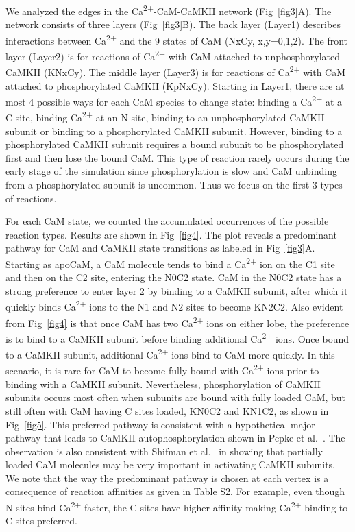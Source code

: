 \documentclass[10pt,letterpaper]{article}
\begin{document}
We analyzed the edges in the Ca\textsuperscript{2+}-CaM-CaMKII network (Fig~\ref{fig3}A). The network consists of three layers (Fig~\ref{fig3}B). The back layer (Layer1) describes interactions between Ca\textsuperscript{2+} and the 9 states of CaM (NxCy, x,y=0,1,2). The front layer (Layer2) is for reactions of Ca\textsuperscript{2+} with CaM attached to unphosphorylated CaMKII (KNxCy). The middle layer (Layer3) is for reactions of Ca\textsuperscript{2+} with CaM attached to phosphorylated CaMKII (KpNxCy). Starting in Layer1, there are at most 4 possible ways for each CaM species to change state: binding a Ca\textsuperscript{2+} at a C site, binding Ca\textsuperscript{2+} at an N site, binding to an unphosphorylated CaMKII subunit or binding to a phosphorylated CaMKII subunit. However, binding to a phosphorylated CaMKII subunit requires a bound subunit to be phosphorylated first and then lose the bound CaM. This type of reaction rarely occurs during the early stage of the simulation since phosphorylation is slow and CaM unbinding from a phosphorylated subunit is uncommon. Thus we focus on the first 3 types of reactions.

For each CaM state, we counted the accumulated occurrences of the possible reaction types. Results are shown in Fig~\ref{fig4}. The plot reveals a predominant pathway for CaM and CaMKII state transitions as labeled in Fig~\ref{fig3}A. Starting as apoCaM, a CaM molecule tends to bind a Ca\textsuperscript{2+} ion on the C1 site and then on the C2 site, entering the N0C2 state. CaM in the N0C2 state has a strong preference to enter layer 2 by binding to a CaMKII subunit, after which it quickly binds Ca\textsuperscript{2+} ions to the N1 and N2 sites to become KN2C2. Also evident from Fig~\ref{fig4} is that once CaM has two Ca\textsuperscript{2+} ions on either lobe, the preference is to bind to a CaMKII subunit before binding additional Ca\textsuperscript{2+} ions. Once bound to a CaMKII subunit, additional Ca\textsuperscript{2+} ions bind to CaM more quickly. In this scenario, it is rare for CaM to become fully bound with Ca\textsuperscript{2+} ions prior to binding with a CaMKII subunit. Nevertheless, phosphorylation of CaMKII subunits occurs most often when subunits are bound with fully loaded CaM, but still often with CaM having C sites loaded, KN0C2 and KN1C2, as shown in Fig~\ref{fig5}. This preferred pathway is consistent with a hypothetical major pathway that leads to CaMKII autophosphorylation shown in Pepke et al.~\cite{Pepke:2010ju}. The observation is also consistent with Shifman et al.~\cite{Shifman:2006hw} in showing that partially loaded CaM molecules may be very important in activating CaMKII subunits. We note that the way the predominant pathway is chosen at each vertex is a consequence of reaction affinities as given in Table S2. For example, even though N sites bind Ca\textsuperscript{2+} faster, the C sites have higher affinity making Ca\textsuperscript{2+} binding to C sites preferred. 
\end{document}
